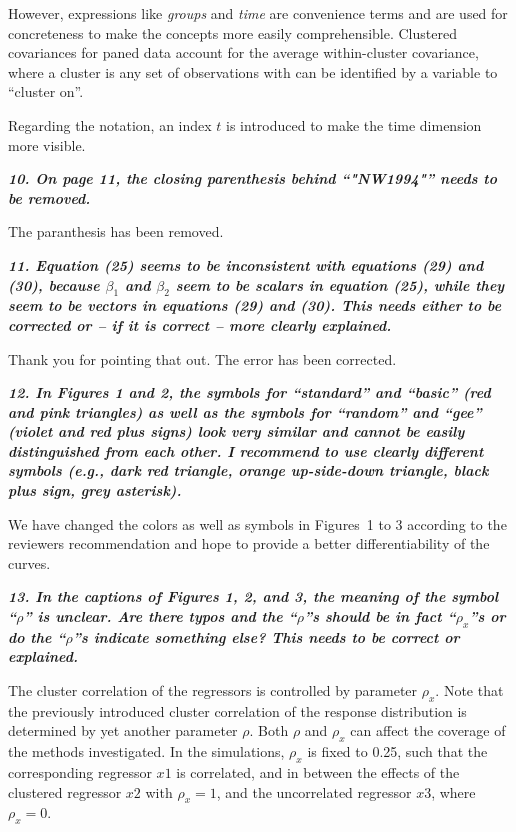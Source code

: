 \documentclass[10pt,a4paper]{article}
\begin{document}
However, expressions like \emph{groups} and \emph{time} are convenience terms and are used for concreteness to make the concepts more easily comprehensible. Clustered covariances for paned data account for the average within-cluster covariance, where a cluster is any set of observations with can be identified by a variable to ``cluster on''. 

Regarding the notation, an index $t$ is introduced to make the time dimension more visible.

\medskip

\textbf{\textit{10. On page 11, the closing parenthesis behind ``"NW1994"'' needs to be removed.}}

\medskip

The paranthesis has been removed.

\medskip

\textbf{\textit{11. Equation (25) seems to be inconsistent with equations (29) and (30), because $\beta_1$ and
$\beta_2$ seem to be scalars in equation (25), while they seem to be vectors in equations (29)
and (30). This needs either to be corrected or -- if it is correct -- more clearly explained.}}

\medskip

Thank you for pointing that out. The error has been corrected.

\medskip

\textbf{\textit{12. In Figures 1 and 2, the symbols for ``standard'' and ``basic'' (red and pink triangles)
as well as the symbols for ``random'' and ``gee'' (violet and red plus signs) look very
similar and cannot be easily distinguished from each other. I recommend to use clearly
different symbols (e.g., dark red triangle, orange up-side-down triangle, black plus sign,
grey asterisk).}}

\medskip

We have changed the colors as well as symbols in Figures~1 to 3 according to the reviewers recommendation and hope to provide a better differentiability of the curves.

\medskip

\textbf{\textit{13. In the captions of Figures 1, 2, and 3, the meaning of the symbol ``$\rho$'' is unclear. Are
there typos and the ``$\rho$''s should be in fact ``$\rho_x$''s or do the ``$\rho$''s indicate something else?
This needs to be correct or explained.}}

\medskip

The cluster correlation of the regressors is controlled by parameter $\rho_x$. Note that the previously introduced cluster correlation of the response distribution is determined by yet another parameter $\rho$. Both $\rho$ and $\rho_x$ can affect the coverage of the methods investigated. In the simulations, $\rho_x$ is fixed to 0.25, such that the corresponding regressor $x1$ is correlated, and in between the effects of the clustered regressor $x2$ with $\rho_x = 1$, and the uncorrelated regressor $x3$, where $\rho_x = 0$.
\end{document}
